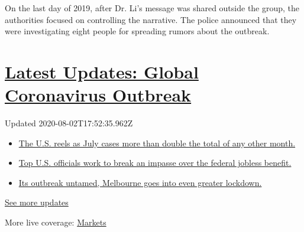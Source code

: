 On the last day of 2019, after Dr. Li's message was shared outside the
group, the authorities focused on controlling the narrative. The police
announced that they were investigating eight people for spreading rumors
about the outbreak.

\hypertarget{latest-updates-global-coronavirus-outbreak}{%
\section{\texorpdfstring{\href{https://www.nytimes3xbfgragh.onion/2020/08/01/world/coronavirus-covid-19.html?action=click\&pgtype=Article\&state=default\&region=MAIN_CONTENT_1\&context=storylines_live_updates}{Latest
Updates: Global Coronavirus
Outbreak}}{Latest Updates: Global Coronavirus Outbreak}}\label{latest-updates-global-coronavirus-outbreak}}

Updated 2020-08-02T17:52:35.962Z

\begin{itemize}
\tightlist
\item
  \href{https://www.nytimes3xbfgragh.onion/2020/08/01/world/coronavirus-covid-19.html?action=click\&pgtype=Article\&state=default\&region=MAIN_CONTENT_1\&context=storylines_live_updates\#link-34047410}{The
  U.S. reels as July cases more than double the total of any other
  month.}
\item
  \href{https://www.nytimes3xbfgragh.onion/2020/08/01/world/coronavirus-covid-19.html?action=click\&pgtype=Article\&state=default\&region=MAIN_CONTENT_1\&context=storylines_live_updates\#link-780ec966}{Top
  U.S. officials work to break an impasse over the federal jobless
  benefit.}
\item
  \href{https://www.nytimes3xbfgragh.onion/2020/08/01/world/coronavirus-covid-19.html?action=click\&pgtype=Article\&state=default\&region=MAIN_CONTENT_1\&context=storylines_live_updates\#link-2bc8948}{Its
  outbreak untamed, Melbourne goes into even greater lockdown.}
\end{itemize}

\href{https://www.nytimes3xbfgragh.onion/2020/08/01/world/coronavirus-covid-19.html?action=click\&pgtype=Article\&state=default\&region=MAIN_CONTENT_1\&context=storylines_live_updates}{See
more updates}

More live coverage:
\href{https://www.nytimes3xbfgragh.onion/live/2020/07/31/business/stock-market-today-coronavirus?action=click\&pgtype=Article\&state=default\&region=MAIN_CONTENT_1\&context=storylines_live_updates}{Markets}

